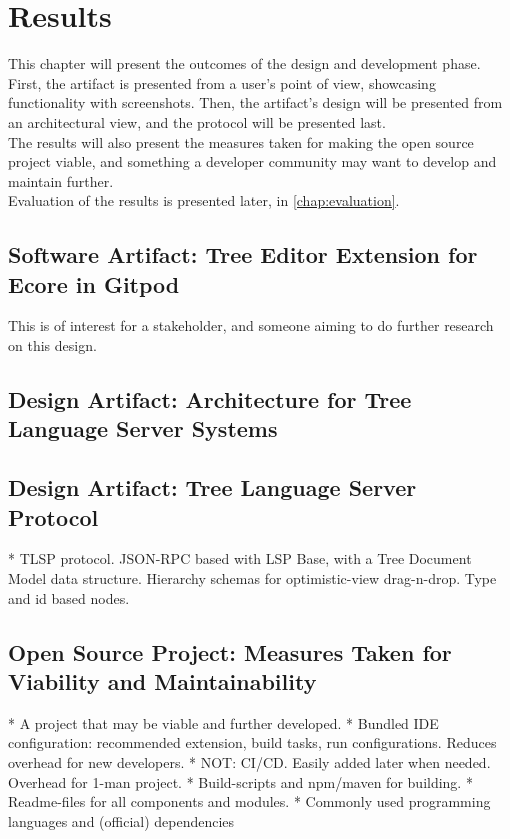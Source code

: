 \chapter{Results}\label{chap:results}

This chapter will present the outcomes of the design and development phase.
First, the artifact is presented from a user's point of view, showcasing functionality with screenshots.
Then, the artifact's design will be presented from an architectural view, and the protocol will be presented last.\\

The results will also present the measures taken for making the \gls{open source} project viable, and something a developer community may want to develop and maintain further.\\

Evaluation of the results is presented later, in \cref{chap:evaluation}.

\section{Software Artifact: Tree Editor Extension for Ecore in Gitpod}

This is of interest for a stakeholder, and someone aiming to do further research on this design.




\section{Design Artifact: Architecture for Tree Language Server Systems}




\section{Design Artifact: Tree Language Server Protocol}\label{sec:tlsp}



* TLSP protocol. JSON-RPC based with LSP Base, with a Tree Document Model data structure. Hierarchy schemas for optimistic-view drag-n-drop. Type and id based nodes. 


\section{Open Source Project: Measures Taken for Viability and Maintainability}

* A project that may be viable and further developed.
  * Bundled IDE configuration: recommended extension, build tasks, run configurations. Reduces overhead for new developers.
  * NOT: CI/CD. Easily added later when needed. Overhead for 1-man project.
  * Build-scripts and npm/maven for building.
  * Readme-files for all components and modules.
  * Commonly used programming languages and (official) dependencies
  
